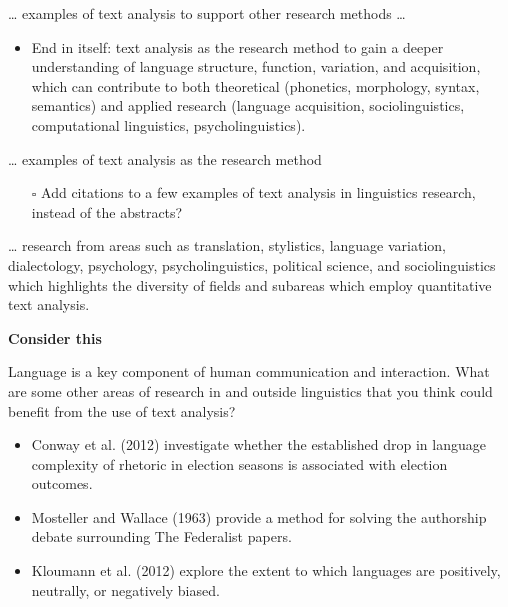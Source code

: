 \documentclass[
  letterpaper,
]{latex/krantz}
\providecommand{\tightlist}{%
  \setlength{\itemsep}{0pt}\setlength{\parskip}{0pt}}\usepackage{longtable,booktabs,array}
\begin{document}
\ldots{} examples of text analysis to support other research methods
\ldots{}

\begin{itemize}
\tightlist
\item
  End in itself: text analysis as the research method to gain a deeper
  understanding of language structure, function, variation, and
  acquisition, which can contribute to both theoretical (phonetics,
  morphology, syntax, semantics) and applied research (language
  acquisition, sociolinguistics, computational linguistics,
  psycholinguistics).
\end{itemize}

\ldots{} examples of text analysis as the research method

\begin{itemize}
\tightlist
\item[$\square$]
  Add citations to a few examples of text analysis in linguistics
  research, instead of the abstracts?
\end{itemize}

\ldots{} research from areas such as translation, stylistics, language
variation, dialectology, psychology, psycholinguistics, political
science, and sociolinguistics which highlights the diversity of fields
and subareas which employ quantitative text analysis.

\begin{tcolorbox}[enhanced jigsaw, left=2mm, arc=.35mm, colback=white, rightrule=.15mm, toprule=.15mm, breakable, leftrule=.75mm, opacityback=0, bottomrule=.15mm]

\textbf{ Consider this}

Language is a key component of human communication and interaction. What
are some other areas of research in and outside linguistics that you
think could benefit from the use of text analysis?

\begin{itemize}
\tightlist
\item
  Conway et al. (2012) investigate whether the established drop in
  language complexity of rhetoric in election seasons is associated with
  election outcomes.
\end{itemize}

\begin{itemize}
\tightlist
\item
  Mosteller and Wallace (1963) provide a method for solving the
  authorship debate surrounding The Federalist papers.
\end{itemize}

\begin{itemize}
\tightlist
\item
  Kloumann et al. (2012) explore the extent to which languages are
  positively, neutrally, or negatively biased.
\end{itemize}

\end{tcolorbox}
\end{document}
